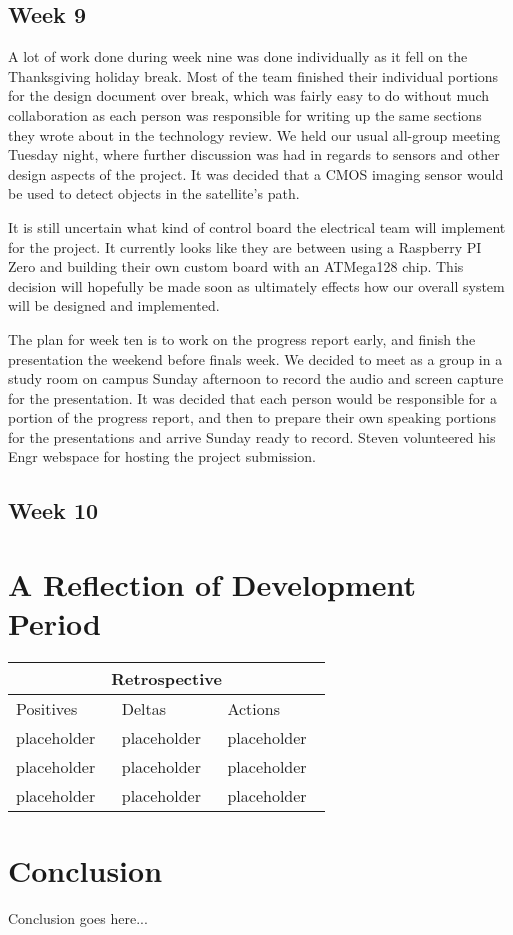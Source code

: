 \documentclass[10pt,letterpaper,onecolumn,draftclsnofoot,journal]{IEEEtran}
\begin{document}
\subsection{Week 9}
\par
A lot of work done during week nine was done individually as it fell on the Thanksgiving holiday break. Most of the team finished their individual portions for the design document over break, which was fairly easy to do without much collaboration as each person was responsible for writing up the same sections they wrote about in the technology review. We held our usual all-group meeting Tuesday night, where further discussion was had in regards to sensors and other design aspects of the project. It was decided that a CMOS imaging sensor would be used to detect objects in the satellite's path.
\par
It is still uncertain what kind of control board the electrical team will implement for the project. It currently looks like they are between using a Raspberry PI Zero and building their own custom board with an ATMega128 chip. This decision will hopefully be made soon as ultimately effects how our overall system will be designed and implemented.
\par
The plan for week ten is to work on the progress report early, and finish the presentation the weekend before finals week. We decided to meet as a group in a study room on campus Sunday afternoon to record the audio and screen capture for the presentation. It was decided that each person would be responsible for a portion of the progress report, and then to prepare their own speaking portions for the presentations and arrive Sunday ready to record. Steven volunteered his Engr webspace for hosting the project submission.

\subsection{Week 10}



\section{A Reflection of Development Period}
\begin{tabular}{ |p{0.3\linewidth}|p{0.3\linewidth}|p{0.3\linewidth}|  }
\hline
\multicolumn{3}{|c|}{Retrospective} \\
\hline
Positives& Deltas &Actions \\
\hline
placeholder & placeholder &placeholder \\
placeholder & placeholder &placeholder \\
placeholder & placeholder &placeholder \\
\hline
\end{tabular}

\section{Conclusion}
Conclusion goes here...


%
%
\end{document}
